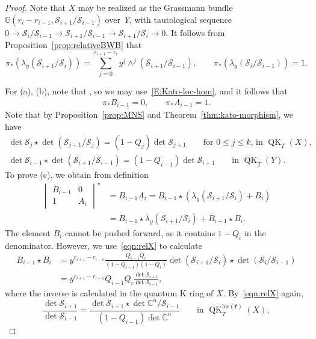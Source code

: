 \documentclass[pdftex]{sigma}
\numberwithin{equation}{section}
\theoremstyle{definition}
\DeclareMathOperator{\QK}{QK}
\def\loc{{\mathrm{loc}}}
\newcommand{\C}{{\mathbb C}}
\newcommand{\cS}{{\mathcal S}}
\begin{document}
 \begin{proof}
 Note that $X$ may be realized as the Grassmann bundle $\mathbb{G}(r_i-r_{i-1}, \cS_{i+1}/\cS_{i-1})$
 over~$Y$, with tautological sequence $0 \to \cS_i/\cS_{i-1} \to \cS_{i+1}/\cS_{i-1} \to \cS_{i+1}/\cS_{i} \to 0$.
 It follows from Proposition~\ref{prop:relativeBWB} that
 \begin{equation}\label{eqn:pushforwards-lambda}
 \pi_*(\lambda_y(\cS_{i+1}/\cS_{i}))=\sum_{j=0}^{r_{i+1}-r_i}y^j\wedge^j(\cS_{i+1}/\cS_{i-1}), \qquad\pi_* (\lambda_y(\cS_i/\cS_{i-1})) = 1.
 \end{equation}

 For (a), (b), note that \smash{$A_{i-1}, B_{i-1}\in \QK_T^{\loc(\mathbf{\hat r})}(X)$}, so we may use~\eqref{E:Kato-loc-hom}, and it follows that
 \begin{gather*}%
 \pi_*B_{i-1}=0,\qquad \pi_*A_{i-1} = 1.
 \end{gather*}
 Note that by Proposition~\ref{prop:MNS} and Theorem~\ref{thm:kato-morphism}, we have
 \begin{gather}
 \det\cS_{j}\star\det(\cS_{j+1}/\cS_{j})=(1-Q_{j})\det\cS_{j+1}\qquad \text{for $0\leq j\leq k$, in $\QK_T(X)$},\label{eqn:relX}\\
 \det\cS_{i-1}\star\det(\cS_{i+1}/\cS_{i-1})=(1-Q_{i-1})\det\cS_{i+1}\qquad \text{in $\QK_T(Y)$}.\label{eqn:relY}
\end{gather}
 To prove (c), we obtain from definition
 \begin{align}
 \begin{vmatrix}
 B_{i-1} & 0\\
 1 & A_{i}
 \end{vmatrix}^\star
 &{}= B_{i-1}A_i=B_{i-1} \star (\lambda_y(\cS_{i+1}/\cS_i)+B_i)\nonumber\\
 &{}= B_{i-1}\star \lambda_y(\cS_{i+1}/\cS_i)+ B_{i-1} \star B_i .\qquad\label{eqn:3-expand}
 \end{align}
 The element $B_{i}$ cannot be pushed forward, as it contains $1-Q_i$ in the denominator. However,
 we use~\eqref{eqn:relX} to calculate
 \begin{align*}
 B_{i-1} \star B_i &{}= y^{r_{i+1}-r_{i-1}} \frac{Q_{i-1} Q_i}{(1-Q_{i-1})(1-Q_i)} \det (\cS_{i+1}/\cS_i) \star \det (\cS_{i}/\cS_{i-1}) \\
 &{}= y^{r_{i+1}-r_{i-1}}Q_{i-1}Q_i\frac{\det\cS_{i+1}}{\det\cS_{i-1}} ,
 \end{align*}
 where the inverse is calculated in the quantum K ring of $X$. By~\eqref{eqn:relX} again,
 \[ \frac{\det\cS_{i+1}}{\det\cS_{i-1}} = \frac{\det \cS_{i+1} \star\det \C^n/\cS_{i-1}}{(1-Q_{i-1})\det \C^n}\qquad \text{in $\QK_T^{\loc(\mathbf{\hat r})}(X)$}, \]

\end{proof}
\end{document}
